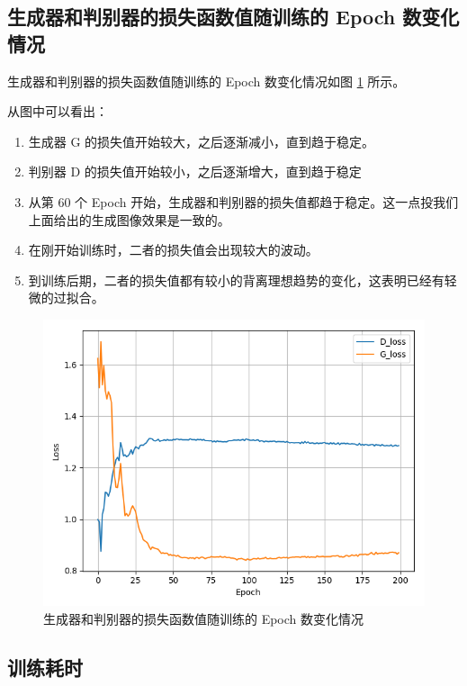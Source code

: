 \documentclass[a4paper, 12pt]{article}
\begin{document}
\subsection{生成器和判别器的损失函数值随训练的 Epoch 数变化情况}
生成器和判别器的损失函数值随训练的 Epoch 数变化情况如图 \ref{fig:loss} 所示。

从图中可以看出：

\begin{enumerate}[leftmargin=*,labelindent=2em]
\item 生成器 G 的损失值开始较大，之后逐渐减小，直到趋于稳定。
\item 判别器 D 的损失值开始较小，之后逐渐增大，直到趋于稳定
\item 从第 60 个 Epoch 开始，生成器和判别器的损失值都趋于稳定。这一点投我们上面给出的生成图像效果是一致的。
\item 在刚开始训练时，二者的损失值会出现较大的波动。
\item 到训练后期，二者的损失值都有较小的背离理想趋势的变化，这表明已经有轻微的过拟合。

\end{enumerate}

\begin{figure}[htbp]
\centering
\includegraphics[width=\textwidth]{./images/MNIST_cGAN_loss.png}
\caption{生成器和判别器的损失函数值随训练的 Epoch 数变化情况}
\label{fig:loss}
\end{figure}

\newpage

\subsection{训练耗时}
\end{document}
